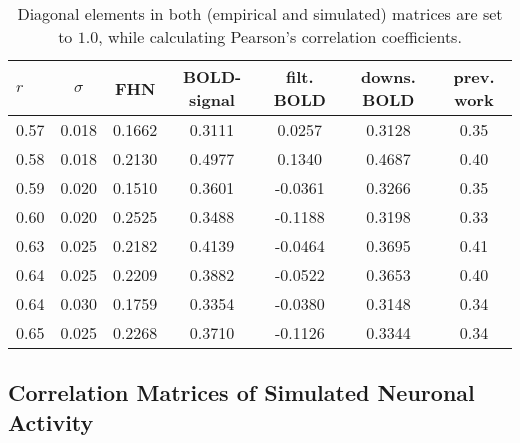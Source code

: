 \documentclass[12pt]{article}
\begin{document}
\begin{table}
		\caption{Diagonal elements in both (empirical and simulated) matrices  are set to $1.0$, while calculating Pearson's correlation coefficients. 	}
	\begin{tabular}{l | c | c | c | c | c | c } \hline
$r$  &  $\sigma$ & FHN     & BOLD-signal & filt. BOLD    & downs. BOLD & prev. work  \\ \hline \hline
0.57 &  0.018 	 & 0.1662  &	0.3111	 &	0.0257		 &	0.3128	   & 0.35   	    \\ \hline
0.58 &  0.018    & 0.2130  &	0.4977	 &	0.1340		 &	0.4687	   & 0.40			\\ \hline
0.59 &  0.020    & 0.1510  &	0.3601	 &	-0.0361		 &	0.3266	   & 0.35			\\ \hline
0.60 &  0.020    & 0.2525  &	0.3488	 &	-0.1188		 &	0.3198	   & 0.33			\\ \hline
0.63 &  0.025    & 0.2182  &	0.4139	 &	-0.0464		 &	0.3695	   & 0.41			\\ \hline
0.64 &  0.025    & 0.2209  &	0.3882	 &	-0.0522		 &	0.3653	   & 0.40			\\ \hline
0.64 &  0.030    & 0.1759  &	0.3354	 &	-0.0380		 &	0.3148	   & 0.34			\\ \hline
0.65 &  0.025    & 0.2268  &	0.3710	 &	-0.1126		 &	0.3344	   & 0.34    		\\ \hline
	\end{tabular}
  
\end{table}  

\newpage


\subsection{Correlation Matrices of Simulated Neuronal Activity}
\end{document}
